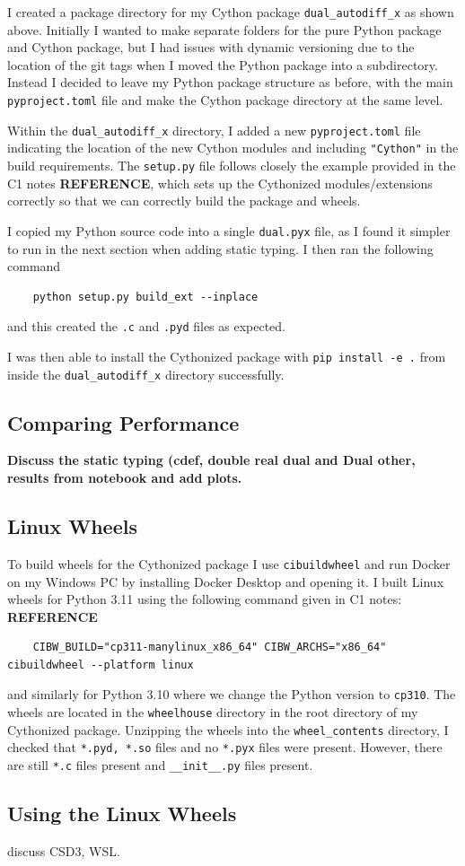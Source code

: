 \documentclass{article}
\begin{document}
I created a package directory for my Cython package \texttt{dual\_autodiff\_x} as shown above. Initially I wanted to make separate folders for the pure Python package and Cython package, but I had issues with dynamic versioning due to the location of the git tags when I moved the Python package into a subdirectory. Instead I decided to leave my Python package structure as before, with the main \texttt{pyproject.toml} file and make the Cython package directory at the same level. 

Within the \texttt{dual\_autodiff\_x} directory, I added a new \texttt{pyproject.toml} file indicating the location of the new Cython modules and including \texttt{"Cython"} in the build requirements. The \texttt{setup.py} file follows closely the example provided in the C1 notes \textbf{REFERENCE}, which sets up the Cythonized modules/extensions correctly so that we can correctly build the package and wheels.

I copied my Python source code into a single \texttt{dual.pyx} file, as I found it simpler to run in the next section when adding static typing. I then ran the following command
\begin{lstlisting}
    python setup.py build_ext --inplace
\end{lstlisting}
and this created the \texttt{.c} and \texttt{.pyd} files as expected. 

I was then able to install the Cythonized package with \texttt{pip install -e .} from inside the \texttt{dual\_autodiff\_x} directory successfully.

\subsection{ Comparing Performance }
\textbf{Discuss the static typing (cdef, double real dual and Dual other, results from notebook and add plots.
}
\subsection{Linux Wheels}
To build wheels for the Cythonized package I use \texttt{cibuildwheel} and run Docker on my Windows PC by installing Docker Desktop and opening it. I built Linux wheels for Python 3.11 using the following command given in C1 notes: \textbf{REFERENCE}
\begin{lstlisting}
    CIBW_BUILD="cp311-manylinux_x86_64" CIBW_ARCHS="x86_64" cibuildwheel --platform linux
\end{lstlisting}
 and similarly for Python 3.10 where we change the Python version to \texttt{cp310}. The wheels are located in the \texttt{wheelhouse} directory in the root directory of my Cythonized package. Unzipping the wheels into the \texttt{wheel\_contents} directory, I checked that \texttt{*.pyd, *.so} files and no \texttt{*.pyx} files were present. However, there are still \texttt{*.c} files present and \texttt{\_\_init\_\_.py} files present.

 \subsection{ Using the Linux Wheels }

 discuss CSD3, WSL.
\end{document}

